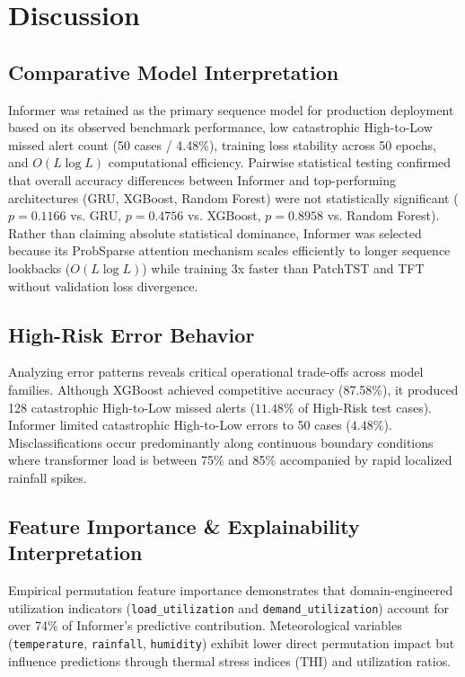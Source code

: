 \section{Discussion}
\subsection{Comparative Model Interpretation}
Informer was retained as the primary sequence model for production deployment based on its observed benchmark performance, low catastrophic High-to-Low missed alert count (50 cases / 4.48\%), training loss stability across 50 epochs, and $O(L \log L)$ computational efficiency. Pairwise statistical testing confirmed that overall accuracy differences between Informer and top-performing architectures (GRU, XGBoost, Random Forest) were not statistically significant ($p = 0.1166$ vs. GRU, $p = 0.4756$ vs. XGBoost, $p = 0.8958$ vs. Random Forest). Rather than claiming absolute statistical dominance, Informer was selected because its ProbSparse attention mechanism scales efficiently to longer sequence lookbacks ($O(L \log L)$) while training 3x faster than PatchTST and TFT without validation loss divergence.

\subsection{High-Risk Error Behavior}
Analyzing error patterns reveals critical operational trade-offs across model families. Although XGBoost achieved competitive accuracy (87.58\%), it produced 128 catastrophic High-to-Low missed alerts ($11.48\%$ of High-Risk test cases). Informer limited catastrophic High-to-Low errors to 50 cases ($4.48\%$). Misclassifications occur predominantly along continuous boundary conditions where transformer load is between 75\% and 85\% accompanied by rapid localized rainfall spikes.

\subsection{Feature Importance \& Explainability Interpretation}
Empirical permutation feature importance demonstrates that domain-engineered utilization indicators (\texttt{load\_utilization} and \texttt{demand\_utilization}) account for over 74\% of Informer's predictive contribution. Meteorological variables (\texttt{temperature}, \texttt{rainfall}, \texttt{humidity}) exhibit lower direct permutation impact but influence predictions through thermal stress indices ($\text{THI}$) and utilization ratios.

